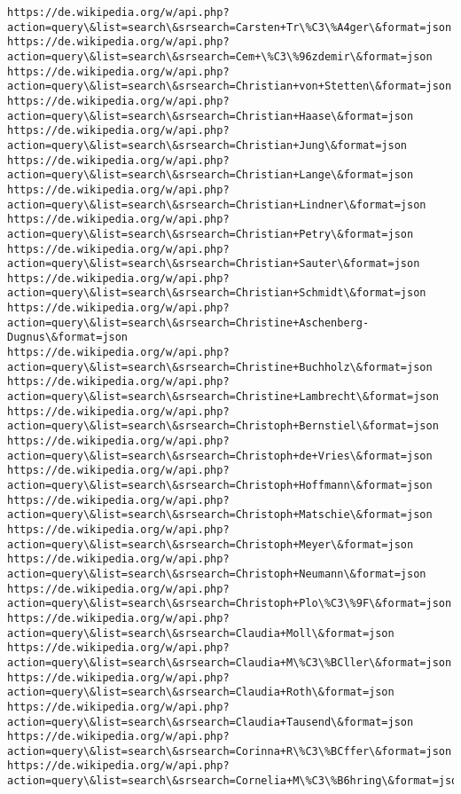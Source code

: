 \documentclass[11pt]{article}
\begin{document}
\begin{Verbatim}[commandchars=\\\{\}]
https://de.wikipedia.org/w/api.php?action=query\&list=search\&srsearch=Carsten+Tr\%C3\%A4ger\&format=json
https://de.wikipedia.org/w/api.php?action=query\&list=search\&srsearch=Cem+\%C3\%96zdemir\&format=json
https://de.wikipedia.org/w/api.php?action=query\&list=search\&srsearch=Christian+von+Stetten\&format=json
https://de.wikipedia.org/w/api.php?action=query\&list=search\&srsearch=Christian+Haase\&format=json
https://de.wikipedia.org/w/api.php?action=query\&list=search\&srsearch=Christian+Jung\&format=json
https://de.wikipedia.org/w/api.php?action=query\&list=search\&srsearch=Christian+Lange\&format=json
https://de.wikipedia.org/w/api.php?action=query\&list=search\&srsearch=Christian+Lindner\&format=json
https://de.wikipedia.org/w/api.php?action=query\&list=search\&srsearch=Christian+Petry\&format=json
https://de.wikipedia.org/w/api.php?action=query\&list=search\&srsearch=Christian+Sauter\&format=json
https://de.wikipedia.org/w/api.php?action=query\&list=search\&srsearch=Christian+Schmidt\&format=json
https://de.wikipedia.org/w/api.php?action=query\&list=search\&srsearch=Christine+Aschenberg-Dugnus\&format=json
https://de.wikipedia.org/w/api.php?action=query\&list=search\&srsearch=Christine+Buchholz\&format=json
https://de.wikipedia.org/w/api.php?action=query\&list=search\&srsearch=Christine+Lambrecht\&format=json
https://de.wikipedia.org/w/api.php?action=query\&list=search\&srsearch=Christoph+Bernstiel\&format=json
https://de.wikipedia.org/w/api.php?action=query\&list=search\&srsearch=Christoph+de+Vries\&format=json
https://de.wikipedia.org/w/api.php?action=query\&list=search\&srsearch=Christoph+Hoffmann\&format=json
https://de.wikipedia.org/w/api.php?action=query\&list=search\&srsearch=Christoph+Matschie\&format=json
https://de.wikipedia.org/w/api.php?action=query\&list=search\&srsearch=Christoph+Meyer\&format=json
https://de.wikipedia.org/w/api.php?action=query\&list=search\&srsearch=Christoph+Neumann\&format=json
https://de.wikipedia.org/w/api.php?action=query\&list=search\&srsearch=Christoph+Plo\%C3\%9F\&format=json
https://de.wikipedia.org/w/api.php?action=query\&list=search\&srsearch=Claudia+Moll\&format=json
https://de.wikipedia.org/w/api.php?action=query\&list=search\&srsearch=Claudia+M\%C3\%BCller\&format=json
https://de.wikipedia.org/w/api.php?action=query\&list=search\&srsearch=Claudia+Roth\&format=json
https://de.wikipedia.org/w/api.php?action=query\&list=search\&srsearch=Claudia+Tausend\&format=json
https://de.wikipedia.org/w/api.php?action=query\&list=search\&srsearch=Corinna+R\%C3\%BCffer\&format=json
https://de.wikipedia.org/w/api.php?action=query\&list=search\&srsearch=Cornelia+M\%C3\%B6hring\&format=json

\end{Verbatim}
\end{document}
